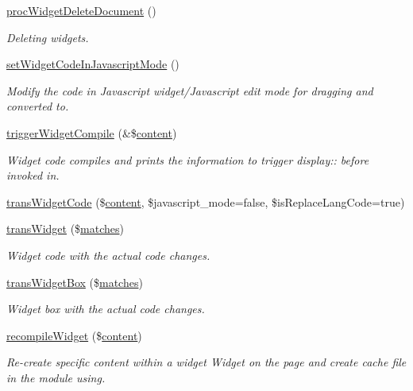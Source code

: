 \begin{DoxyCompactItemize}
\hyperlink{classwidgetController_a9223bf4586acbe9f3262cde3cff193a7}{proc\+Widget\+Delete\+Document} ()
\begin{DoxyCompactList}\small\item\em Deleting widgets. \end{DoxyCompactList}\item 
\hyperlink{classwidgetController_a528aa6c73d47f9149cfe88528d28b5c7}{set\+Widget\+Code\+In\+Javascript\+Mode} ()
\begin{DoxyCompactList}\small\item\em Modify the code in Javascript widget/\+Javascript edit mode for dragging and converted to. \end{DoxyCompactList}\item 
\hyperlink{classwidgetController_acb8488ae3081bdfcf77dbd73740174be}{trigger\+Widget\+Compile} (\&\$\hyperlink{classcontent}{content})
\begin{DoxyCompactList}\small\item\em Widget code compiles and prints the information to trigger display\+:\+: before invoked in. \end{DoxyCompactList}\item 
\hyperlink{classwidgetController_a948e4ce023dc430a42607019bab5d878}{trans\+Widget\+Code} (\$\hyperlink{classcontent}{content}, \$javascript\+\_\+mode=false, \$is\+Replace\+Lang\+Code=true)
\item 
\hyperlink{classwidgetController_ab83211452280836e73df5f7b6acdea82}{trans\+Widget} (\$\hyperlink{jquery_8mobile_8customized_8min_8js_a0dd9fb10d0da7ad1a1c71aad2c6388f7}{matches})
\begin{DoxyCompactList}\small\item\em Widget code with the actual code changes. \end{DoxyCompactList}\item 
\hyperlink{classwidgetController_ad406bf4681c3dc1ccf37897479218111}{trans\+Widget\+Box} (\$\hyperlink{jquery_8mobile_8customized_8min_8js_a0dd9fb10d0da7ad1a1c71aad2c6388f7}{matches})
\begin{DoxyCompactList}\small\item\em Widget box with the actual code changes. \end{DoxyCompactList}\item 
\hyperlink{classwidgetController_a0f43ca1a0a8bff6d4fe8d8aca50d65e1}{recompile\+Widget} (\$\hyperlink{classcontent}{content})
\begin{DoxyCompactList}\small\item\em Re-\/create specific content within a widget Widget on the page and create cache file in the module using. \end{DoxyCompactList}\item 

\end{DoxyCompactItemize}
